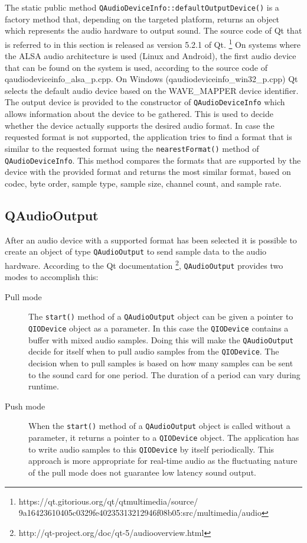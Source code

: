 The static public method {\tt QAudioDeviceInfo::defaultOutputDevice()} is a factory method that, 
depending on the targeted platform, returns an object which represents the audio hardware 
to output sound. The source code of Qt that is referred to in this section is released 
as version 5.2.1 of Qt. \footnote{\label{foot:3}https://qt.gitorious.org/qt/qtmultimedia/source/\\9a16423610405c0329fe40235313212946f08b05:src/multimedia/audio}
On systems where the ALSA audio architecture is used (Linux and Android), 
the first audio device that can be found on the system is used, 
according to the source code of qaudiodeviceinfo\_alsa\_p.cpp. 
On Windows (qaudiodeviceinfo\_win32\_p.cpp) Qt selects the default 
audio device based on the WAVE\_MAPPER device identifier.
\\
The output device is provided to the constructor of {\tt QAudioDeviceInfo} which allows 
information about the device to be gathered. This is used to decide whether the 
device actually supports the desired audio format. In case the requested format is 
not supported, the application tries to find a format that is similar to the requested 
format using the {\tt nearestFormat()} method of {\tt QAudioDeviceInfo}. This method compares 
the formats that are supported by the device with the provided format and returns the 
most similar format, based on codec, byte order, sample type, sample size, channel count, 
and sample rate.

\subsection{QAudioOutput}

After an audio device with a supported format has been selected it is possible to create an 
object of type {\tt QAudioOutput} to send sample data to the audio hardware. 
According to the Qt documentation \footnote{\label{foot:5}http://qt-project.org/doc/qt-5/audiooverview.html}, {\tt QAudioOutput} provides two modes to accomplish this: 

\begin{description}
\item [Pull mode] The {\tt start()} method of a {\tt QAudioOutput} object can be given a pointer to {\tt QIODevice} object as a parameter. In this case the {\tt QIODevice} contains a buffer with mixed audio samples. Doing this will make the {\tt QAudioOutput} decide for itself when to pull audio samples from the {\tt QIODevice}. The decision when to pull samples is based on how many samples can be sent to the sound card for one period. The duration of a period can vary during runtime. \hfill \\
\item [Push mode] When the {\tt start()} method of a {\tt QAudioOutput} object is called without a parameter, it returns a pointer to a {\tt QIODevice} object. The application has to write audio samples to this {\tt QIODevice} by itself periodically. This approach is more appropriate for real-time audio as the fluctuating nature of the pull mode does not guarantee low latency sound output. \hfill \\
\end{description}

